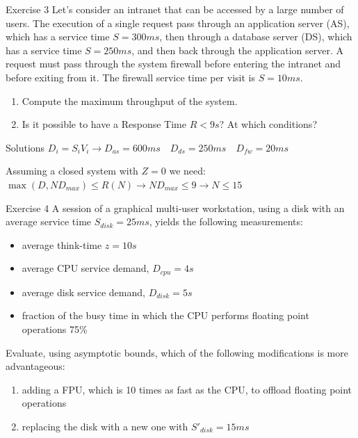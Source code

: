 \documentclass[handout]{beamer}
\begin{document}
\begin{frame}{Exercise 3}
Let’s consider an intranet that can be accessed by a large number of users. The execution of a single
request pass through an application server (AS), which has a service time $S = 300 ms$, then through a database server (DS), which has a service time $S = 250 ms$, and then back through the application server. A request must pass through the system firewall before entering the intranet and before exiting from it. The
firewall service time per visit is $S = 10 ms$.
\begin{enumerate}
	\item Compute the maximum throughput of the system.
	\item Is it possible to have a Response Time $R < 9s$? At which conditions?
\end{enumerate}
\end{frame}

\begin{frame}{Solutions}
$D_i = S_i V_i \rightarrow D_{as} = 600ms \quad D_{ds}=250ms \quad D_{fw} = 20ms$

Assuming a closed system with $Z=0$ we need: $\max(D, ND_{max}) \leq R(N) \rightarrow ND_{max} \leq 9 \rightarrow N \leq 15$
\end{frame}

\begin{frame}{Exercise 4}
A session of a graphical multi-user workstation, using a disk with an average service time $S_{disk} = 25 ms$, yields the following measurements:
\begin{itemize}
\item average think-time $z = 10 s$
\item average CPU service demand, $D_{cpu} = 4 s$
\item average disk service demand, $D_{disk} = 5 s$
\item fraction of the busy time in which the CPU performs floating point operations 75\%
\end{itemize}

Evaluate, using asymptotic bounds, which of the following modifications is more advantageous:
\begin{enumerate}
	\item adding a FPU, which is 10 times as fast as the CPU, to offload floating point operations
	\item replacing the disk with a new one with $S'_{disk} = 15 ms$
\end{enumerate}
\end{frame}
\end{document}
